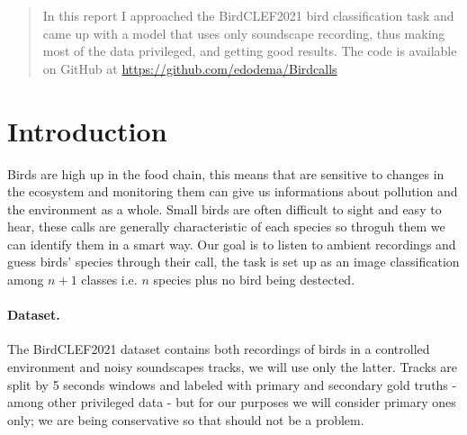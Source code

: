 \documentclass{article}
\begin{document}

\printAffiliationsAndNotice{}

\begin{abstract}
In this report I approached the BirdCLEF2021 bird classification task and came up with a model that uses only soundscape recording, thus making most of the data privileged, and getting good results.
The code is available on GitHub at \href{https://github.com/edodema/Birdcalls}{https://github.com/edodema/Birdcalls}
\end{abstract}

\section{Introduction}
Birds are high up in the food chain, this means that are sensitive to changes in the ecosystem and monitoring them can give us informations about pollution and the environment as a whole.
Small birds are often difficult to sight and easy to hear, these calls are generally characteristic of each species so throguh them we can identify them in a smart way.
Our goal is to listen to ambient recordings and guess birds' species through their call, the task is set up as an image classification among $n+1$ classes i.e. $n$ species plus no bird being destected. 

\paragraph*{Dataset.}
The BirdCLEF2021 dataset contains both recordings of birds in a controlled environment and noisy soundscapes tracks, we will use only the latter.
Tracks are split by 5 seconds  windows and labeled with primary and secondary gold truths - among other privileged data - but for our purposes we will consider primary ones only; we are being conservative so that should not be a problem.
\end{document}
